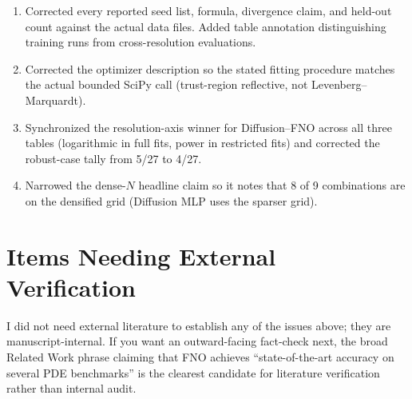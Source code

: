 \documentclass[11pt]{article}
\begin{document}
\begin{enumerate}
\item Corrected every reported seed list, formula, divergence claim, and held-out count against the actual data files. Added table annotation distinguishing training runs from cross-resolution evaluations.
\item Corrected the optimizer description so the stated fitting procedure matches the actual bounded SciPy call (trust-region reflective, not Levenberg--Marquardt).
\item Synchronized the resolution-axis winner for Diffusion--FNO across all three tables (logarithmic in full fits, power in restricted fits) and corrected the robust-case tally from 5/27 to 4/27.
\item Narrowed the dense-$N$ headline claim so it notes that 8 of 9 combinations are on the densified grid (Diffusion MLP uses the sparser grid).
\end{enumerate}

\section*{Items Needing External Verification}

I did not need external literature to establish any of the issues above; they are manuscript-internal. If you want an outward-facing fact-check next, the broad Related Work phrase claiming that FNO achieves ``state-of-the-art accuracy on several PDE benchmarks'' is the clearest candidate for literature verification rather than internal audit.
\end{document}
